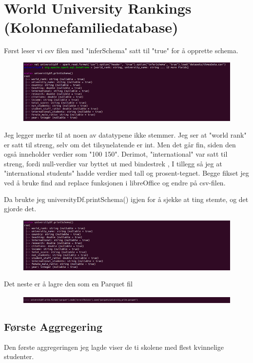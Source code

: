 \section{World University Rankings (Kolonnefamiliedatabase)}

Først leser vi csv filen med "inferSchema" satt til "true" for å opprette schema.
\FigureCounter
\begin{figure}
    \includegraphics[width=\textwidth]{images/milepael5/csvRead.png}
\end{figure}

Jeg legger merke til at noen av datatypene ikke stemmer. Jeg ser at "world rank" er satt til streng, selv om det tilsynelatende er int. Men det går fin, siden den også inneholder verdier som "100 150". Derimot, "international" var satt til streng, fordi null-verdier var byttet ut med bindestrek , I tillegg så jeg at "international students" hadde verdier med tall og prosent-tegnet. Begge fikset jeg ved å bruke find and replace funksjonen i libreOffice og endre på csv-filen.

Da brukte jeg universityDf.printSchema() igjen for å sjekke at ting stemte, og det gjorde det.
\FigureCounter
\begin{figure}[H]
    \includegraphics[width=\textwidth]{images/milepael5/printSchema.png}
\end{figure}

Det neste er å lagre den som en Parquet fil
\FigureCounter
\begin{figure}[H]
    \includegraphics[width=\textwidth]{images/milepael5/writeParquet.png}
\end{figure}

\subsection{Første Aggregering}
Den første aggregeringen jeg lagde viser de ti skolene med flest kvinnelige studenter. 

